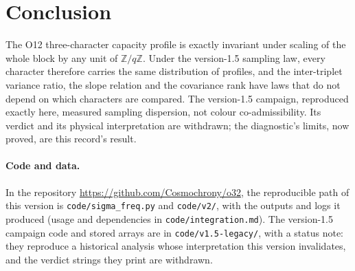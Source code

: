 \documentclass[12pt,a4paper]{article}
\theoremstyle{definition}
\theoremstyle{remark}
\newcommand{\Zq}{\mathbb{Z}/q\mathbb{Z}}
\begin{document}
  \section{Conclusion}
  \label{sec:conclusion}

  The O12 three-character capacity profile is exactly invariant under scaling of the whole block
  by any unit of $\Zq$.
  Under the version-1.5 sampling law, every character therefore carries the same distribution of
  profiles, and the inter-triplet variance ratio, the slope relation and the covariance rank have
  laws that do not depend on which characters are compared.
  The version-1.5 campaign, reproduced exactly here, measured sampling dispersion, not colour
  co-admissibility.
  Its verdict and its physical interpretation are withdrawn; the diagnostic's limits, now proved,
  are this record's result.

  \paragraph{Code and data.}
  In the repository \url{https://github.com/Cosmochrony/o32}, the reproducible path of this version is
  \texttt{code/sigma\_freq.py} and \texttt{code/v2/}, with the outputs and logs it produced (usage and
  dependencies in \texttt{code/integration.md}).
  The version-1.5 campaign code and stored arrays are in \texttt{code/v1.5-legacy/}, with a status note:
  they reproduce a historical analysis whose interpretation this version invalidates, and the verdict
  strings they print are withdrawn.

  \clearpage
  
  
\end{document}
